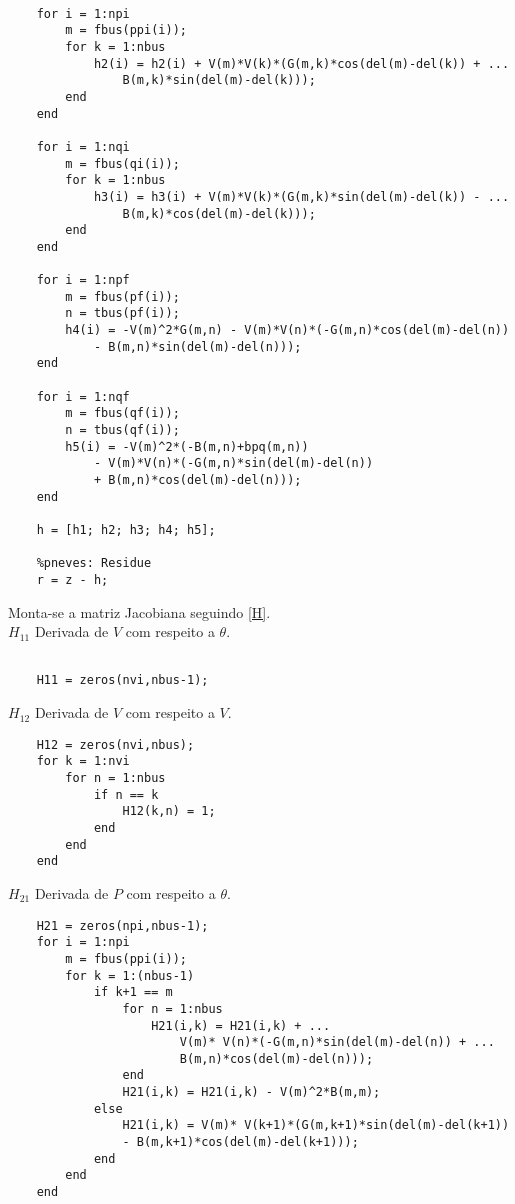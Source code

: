 \begin{verbatim}

    for i = 1:npi
        m = fbus(ppi(i));
        for k = 1:nbus
            h2(i) = h2(i) + V(m)*V(k)*(G(m,k)*cos(del(m)-del(k)) + ...
                B(m,k)*sin(del(m)-del(k)));
        end
    end
    
    for i = 1:nqi
        m = fbus(qi(i));
        for k = 1:nbus
            h3(i) = h3(i) + V(m)*V(k)*(G(m,k)*sin(del(m)-del(k)) - ...
                B(m,k)*cos(del(m)-del(k)));
        end
    end
    
    for i = 1:npf
        m = fbus(pf(i));
        n = tbus(pf(i));
        h4(i) = -V(m)^2*G(m,n) - V(m)*V(n)*(-G(m,n)*cos(del(m)-del(n))
            - B(m,n)*sin(del(m)-del(n)));
    end
    
    for i = 1:nqf
        m = fbus(qf(i));
        n = tbus(qf(i));
        h5(i) = -V(m)^2*(-B(m,n)+bpq(m,n)) 
            - V(m)*V(n)*(-G(m,n)*sin(del(m)-del(n))
            + B(m,n)*cos(del(m)-del(n)));
    end
    
    h = [h1; h2; h3; h4; h5];
    
    %pneves: Residue
    r = z - h;
\end{verbatim}
Monta-se a matriz Jacobiana seguindo \ref{H}.\\
$H_{11}$ Derivada de $V$ com respeito a $\theta$.
\begin{verbatim}

    H11 = zeros(nvi,nbus-1);

\end{verbatim}
$H_{12}$ Derivada de $V$ com respeito a $V$.
\begin{verbatim}
    H12 = zeros(nvi,nbus);
    for k = 1:nvi
        for n = 1:nbus
            if n == k
                H12(k,n) = 1;
            end
        end
    end
\end{verbatim}
$H_{21}$ Derivada de $P$ com respeito a $\theta$.
\begin{verbatim}
    H21 = zeros(npi,nbus-1);
    for i = 1:npi
        m = fbus(ppi(i));
        for k = 1:(nbus-1)
            if k+1 == m
                for n = 1:nbus
                    H21(i,k) = H21(i,k) + ...
                        V(m)* V(n)*(-G(m,n)*sin(del(m)-del(n)) + ...
                        B(m,n)*cos(del(m)-del(n)));
                end
                H21(i,k) = H21(i,k) - V(m)^2*B(m,m);
            else
                H21(i,k) = V(m)* V(k+1)*(G(m,k+1)*sin(del(m)-del(k+1)) 
                - B(m,k+1)*cos(del(m)-del(k+1)));
            end
        end
    end
\end{verbatim}
